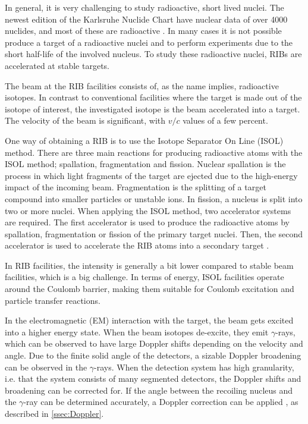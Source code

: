 \documentclass[twoside,english]{uiofysmaster/uiofysmaster}
\newcommand{\ga}{$\gamma$}
\let\orgautoref\autoref
\renewcommand{\autoref}
        {%
		 \def\sectionautorefname{Section}%
		 \def\subsectionautorefname{Section}%
		 \def\subsubsectionautorefname{Section}%
		 \def\chapterautorefname{Chapter}%
          \orgautoref}
\begin{document}
In general, it is very challenging to study radioactive, short lived nuclei. 
The newest edition of the Karlsruhe Nuclide Chart have nuclear data of over 4000 nuclides, and most of these are radioactive \cite{CoN}. 
In many cases it is not possible produce a target of a radioactive nuclei and to perform experiments due to the short half-life of the involved nucleus. 
To study these radioactive nuclei, RIBs are accelerated at stable targets. 

The beam at the RIB facilities consists of, as the name implies, radioactive isotopes. 
In contrast to conventional facilities where the target is made out of the isotope of interest, the investigated isotope is the beam accelerated into a target.
The velocity of the beam is significant, with $v/c$ values of a few percent. 

One way of obtaining a RIB is to use the Isotope Separator On Line (ISOL) method. 
There are three main reactions for producing radioactive atoms with the ISOL method; spallation, fragmentation and fission. 
Nuclear spallation is the process in which light fragments of the target are ejected due to the high-energy impact of the incoming beam. 
Fragmentation is the splitting of a target compound into smaller particles or unstable ions. 
In fission, a nucleus is split into two or more nuclei.
When applying the ISOL method, two accelerator systems are required. 
The first accelerator is used to produce the radioactive atoms by spallation, fragmentation or fission of the primary target nuclei. 
Then, the second accelerator is used to accelerate the RIB atoms into a secondary target \cite{ISOLDE-web, Lindroos, ISOL}. 

In RIB facilities, the intensity is generally a bit lower compared to stable beam facilities, which is a big challenge. 
In terms of energy, ISOL facilities operate around the Coulomb barrier, making them suitable for Coulomb excitation and particle transfer reactions. 

In the electromagnetic (EM) interaction with the target, the beam gets excited into a higher energy state.
When the beam isotopes de-excite, they emit \ga-rays, which can be observed to have large Doppler shifts depending on the velocity and angle.
Due to the finite solid angle of the detectors, a sizable Doppler broadening can be observed in the \ga-rays. 
When the detection system has high granularity, i.e. that the system consists of many segmented detectors, the Doppler shifts and broadening can be corrected for. 
If the angle between the recoiling nucleus and the \ga-ray can be determined accurately, a Doppler correction can be applied \cite{MB-spect}, as described in \autoref{ssec:Doppler}.
\end{document}
